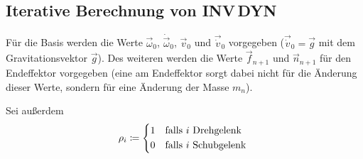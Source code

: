 		\subsection{Iterative Berechnung von INV\,DYN}
			Für die Basis werden die Werte \( \vec{\omega}_0 \), \( \dot{\vec{\omega}}_0 \), \( \vec{v}_0 \) und \( \vec{\dot{v}}_0 \) vorgegeben (\zB \( \vec{\dot{v}}_0 = \vec{g} \) mit dem Gravitationsvektor \(\vec{g}\)). Des weiteren werden die Werte \( \vec{f}_{n + 1} \) und \( \vec{n}_{n + 1} \) für den Endeffektor vorgegeben (eine am Endeffektor sorgt dabei nicht für die Änderung dieser Werte, sondern für eine Änderung der Masse \(m_n\)).

			Sei außerdem
			\begin{equation*}
				\rho_i \coloneqq
				\begin{cases*}
					1 & falls \(i\) Drehgelenk  \\
					0 & falls \(i\) Schubgelenk
				\end{cases*}
			\end{equation*}

